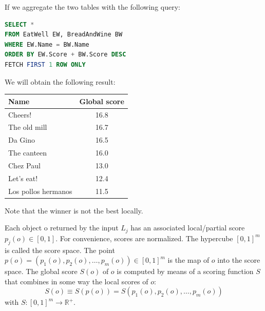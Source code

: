 \documentclass[12pt, a4paper]{report}
\newtheorem[style=M,bodystyle=\normalfont]{theorem}{Theorem}
\newtheorem[style=M,bodystyle=\normalfont]{corollary}{Corollary}
\newtheorem[style=M,bodystyle=\normalfont]{lemma}{Lemma}
\newtheorem[style=M,bodystyle=\normalfont]{definition}{Definition}
\begin{document}
\begin{example}
\begin{table}[H]
        \end{table}
        If we aggregate the two tables with the following query: 
        \begin{lstlisting}[language=SQL]
SELECT *
FROM EatWell EW, BreadAndWine BW
WHERE EW.Name = BW.Name
ORDER BY EW.Score + BW.Score DESC
FETCH FIRST 1 ROW ONLY 
        \end{lstlisting}
        We will obtain the following result: 
        \begin{table}[H]
            \centering
            \begin{tabular}{|lc|}
            \hline
            \textbf{Name}       & \textbf{Global score} \\ \hline
            Cheers!             & 16.8                  \\ \hline
            The old mill        & 16.7                  \\ \hline
            Da Gino             & 16.5                  \\ \hline
            The canteen         & 16.0                  \\ \hline
            Chez Paul           & 13.0                  \\ \hline
            Let's eat!          & 12.4                  \\ \hline
            Los pollos hermanos & 11.5                  \\ \hline
            \end{tabular}
        \end{table}
        Note that the winner is not the best locally. 
    \end{example}
    Each object o returned by the input $L_j$ has an associated local/partial score $p_j(o) \in [0,1]$. For convenience, scores are normalized. The hypercube $[0,1]^m$ 
    is called the score space. The point $p(o) = (p_1(o),p_2(o),\dots,p_m(o)) \in [0,1]^m$ is the map of $o$ into the score space. The global score $S(o)$ of $o$ is 
    computed by means of a scoring function $S$ that combines in some way the local scores of $o$:
    \[S(o) \equiv  S(p(o)) = S(p_1(o),p_2(o),\dots,p_m(o))\]
    with $S:[0,1]^m \rightarrow \mathbb{R}^{+}$. 
\end{document}
